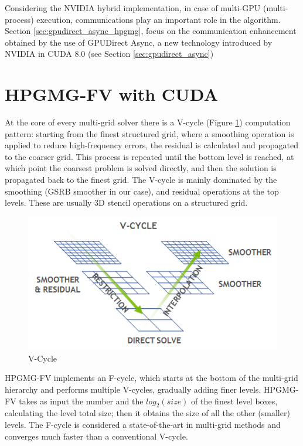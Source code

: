 \documentclass[conference]{IEEEtran}
\begin{document}
Considering the NVIDIA hybrid implementation, in case of multi-GPU (multi-process) execution, communications play an important role in the algorithm. Section \ref{sec:gpudirect_async_hpgmg}, focus on the communication enhancement obtained by the use of GPUDirect Async, a new technology introduced by NVIDIA in CUDA 8.0 (see Section \ref{sec:gpudirect_async})


\section{HPGMG-FV with CUDA}\label{sec:hpgmg_cuda}

At the core of every multi-grid solver there is a V-cycle (Figure \ref{fig:hpgmg_vcycle}) computation pattern: starting from the finest structured grid, where a smoothing operation is applied to reduce high-frequency errors, the residual is calculated and propagated to the coarser grid. This process is repeated until the bottom level is reached, at which point the coarsest problem is solved directly, and then the solution is propagated back to the finest grid. The V-cycle is mainly dominated by the smoothing (GSRB smoother in our case), and residual operations at the top levels. These are usually 3D stencil operations on a structured grid.

\begin{figure}[h]
\includegraphics[scale=0.7]{hpgmg_v_cycle.png}
\caption{V-Cycle}
\label{fig:hpgmg_vcycle}
\end{figure}

HPGMG-FV implements an F-cycle, which starts at the bottom of the multi-grid hierarchy and performs multiple V-cycles, gradually adding finer levels. 
HPGMG-FV takes as input the number and the $log_2(size)$ of the finest level boxes, calculating the level total size; then it obtains the size of all the other (smaller) levels.
The F-cycle is considered a state-of-the-art in multi-grid methods and converges much faster than a conventional V-cycle.
\end{document}

